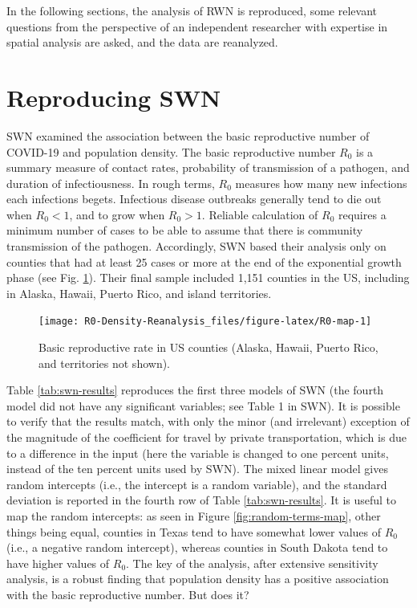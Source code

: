 \documentclass[]{elsarticle} %
\begin{document}
In the following sections, the analysis of RWN is reproduced, some
relevant questions from the perspective of an independent researcher
with expertise in spatial analysis are asked, and the data are
reanalyzed.

\hypertarget{reproducing-swn}{%
\section{Reproducing SWN}\label{reproducing-swn}}

SWN examined the association between the basic reproductive number of
COVID-19 and population density. The basic reproductive number \(R_0\)
is a summary measure of contact rates, probability of transmission of a
pathogen, and duration of infectiousness. In rough terms, \(R_0\)
measures how many new infections each infections begets. Infectious
disease outbreaks generally tend to die out when \(R_0<1\), and to grow
when \(R_0>1\). Reliable calculation of \(R_0\) requires a minimum
number of cases to be able to assume that there is community
transmission of the pathogen. Accordingly, SWN based their analysis only
on counties that had at least 25 cases or more at the end of the
exponential growth phase (see Fig. \ref{fig:R0-map}). Their final sample
included 1,151 counties in the US, including in Alaska, Hawaii, Puerto
Rico, and island territories.

\begin{figure}
\texttt{[image: R0-Density-Reanalysis\_files/figure-latex/R0-map-1]} \caption{\label{fig:R0-map}Basic reproductive rate in US counties (Alaska, Hawaii, Puerto Rico, and territories not shown).}\label{fig:R0-map}
\end{figure}

Table \ref{tab:swn-results} reproduces the first three models of SWN
(the fourth model did not have any significant variables; see Table 1 in
SWN). It is possible to verify that the results match, with only the
minor (and irrelevant) exception of the magnitude of the coefficient for
travel by private transportation, which is due to a difference in the
input (here the variable is changed to one percent units, instead of the
ten percent units used by SWN). The mixed linear model gives random
intercepts (i.e., the intercept is a random variable), and the standard
deviation is reported in the fourth row of Table \ref{tab:swn-results}.
It is useful to map the random intercepts: as seen in Figure
\ref{fig:random-terms-map}, other things being equal, counties in Texas
tend to have somewhat lower values of \(R_0\) (i.e., a negative random
intercept), whereas counties in South Dakota tend to have higher values
of \(R_0\). The key of the analysis, after extensive sensitivity
analysis, is a robust finding that population density has a positive
association with the basic reproductive number. But does it?
\end{document}
